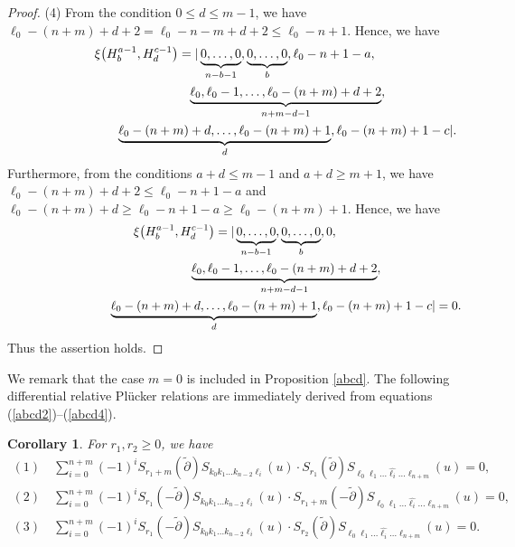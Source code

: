 \documentclass[pdftex]{sigma}
\numberwithin{equation}{section}
\newtheorem{Corollary}[Theorem]{Corollary}
\begin{document}
\begin{proof}
(4) From the condition $0\leq d \leq m-1$, we have $\ell_0-(n+m)+d+2=\ell_{0}-n-m+d+2\leq \ell_{0}-n+1$. Hence, we have
\begin{gather*}
\xi\bigl(H^{a-1}_{b},H^{c-1}_{d}\bigr)=|\underbrace{0,\dots,0}_{n-b-1},%
\underbrace{0,\dots, 0}_{b},\ell_{0}-n+1-a,\nonumber\\
\hphantom{\xi\bigl(H^{a-1}_{b},H^{c-1}_{d}\bigr)=|}{}
\underbrace{\ell_{0},\ell_{0}-1,\dots,\ell_{0}-(n+m)+d+2}_{n+m-d-1},\nonumber\\
\hphantom{\xi\bigl(H^{a-1}_{b},H^{c-1}_{d}\bigr)=|}{}
\underbrace{\ell_{0}-(n+m)+d,\dots,\ell_{0}-(n+m)+1}_{d},\ell_{0}-(n+m)+1-c|\nonumber.
\end{gather*}
Furthermore, from the conditions $a+d\leq m-1$ and $a+d\geq m+1$, we have $\ell_{0}-(n+m)+d+2\leq \ell_{0}-n+1-a$ and $\ell_{0}-(n+m)+d\geq \ell_{0}-n+1-a\geq \ell_{0}-(n+m)+1$.
Hence, we have
\begin{gather*}
\xi\bigl(H^{a-1}_{b},H^{c-1}_{d}\bigr)=|\underbrace{0,\dots,0}_{n-b-1},%
\underbrace{0,\dots, 0}_{b},0,\nonumber\\
\hphantom{\xi\bigl(H^{a-1}_{b},H^{c-1}_{d}\bigr)=|}{}
\underbrace{\ell_{0},\ell_{0}-1,\dots,\ell_{0}-(n+m)+d+2}_{n+m-d-1},\nonumber\\
\hphantom{\xi\bigl(H^{a-1}_{b},H^{c-1}_{d}\bigr)=|}{}
\underbrace{\ell_{0}-(n+m)+d,\dots,\ell_{0}-(n+m)+1}_{d},\ell_{0}-(n+m)+1-c|=0.
\end{gather*}
Thus the assertion holds.
\end{proof}

We remark that the case $m=0$ is included in Proposition \ref{abcd}. The following differential relative Pl\"ucker relations are immediately derived from equations (\ref{abcd2})--(\ref{abcd4}).
\begin{Corollary}%
For $r_1,r_2 \geq 0$, we have
\begin{gather*}
(1)\quad\sum_{i=0}^{n+m}{(-1)}^{i}S_{{r_1}+m}(\widetilde{\partial})S_{k_0 k_1\dots k_{n-2}\ell_i}(u)\cdot S_{r_1}(\widetilde{\partial})S_{\ell_0 \ell_1\dots \widehat{\ell_{i}}\dots\ell_{n+m}}(u)=0,\\
(2)\quad\sum_{i=0}^{n+m}{(-1)}^{i}S_{r_1}(-\widetilde{\partial})S_{k_0 k_1\dots k_{n-2}\ell_i}(u)\cdot S_{{r_1}+m}(-\widetilde{\partial})S_{\ell_0 \ell_1\dots \widehat{\ell_{i}}\dots\ell_{n+m}}(u)=0,\\
(3)\quad\sum_{i=0}^{n+m}{(-1)}^{i}S_{r_1}(-\widetilde{\partial})S_{k_0 k_1\dots k_{n-2}\ell_i}(u)\cdot S_{r_2}(\widetilde{\partial})S_{\ell_0 \ell_1\dots \widehat{\ell_{i}}\dots\ell_{n+m}}(u)=0.
\end{gather*}
\end{Corollary}
\end{document}
